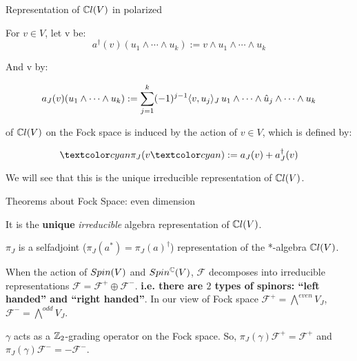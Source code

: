 \begin{frame}{Representation of $\mathbb C l(V)$ in polarized \fjv} %
    
    For $v \in V$, let v be:
    \[ a^\dagger(v) (u_1 \wedge \cdots \wedge u_k) := v \wedge u_1 \wedge \cdots \wedge u_k \]
    
    And v by:
    
    \[ a_J(v) (u_1 \wedge \cdots \wedge u_k) := \sum_{j = 1}^k  (-1)^{j-1}\langle v, u_j \rangle_J\, u_1 \wedge \cdots \wedge \hat u_j \wedge \cdots  \wedge u_k \]
    
     of $\mathbb C l(V)$ on the Fock space is induced by the action of $v \in V$, which is defined by:
    
    \[ \defn{\pi_J(}v\defn{)} := a_J(v) + a_J^\dagger(v) \]
    
    We will see that this is the unique irreducible representation of $\mathbb C l(V)$.
    
\end{frame}

\begin{frame}{Theorems about Fock Space: even dimension} %
    \begin{theorem} It is the \textbf{unique} \emph{irreducible} algebra representation of $\mathbb C l(V)$.\end{theorem}%

    \begin{theorem}$\pi_J$ is a selfadjoint ($\pi_J(a^*) = \pi_J(a)^\dagger$) representation of the *-algebra $\mathbb C l(V)$.\end{theorem}%
    
    \begin{theorem}
    When the action of $Spin(V)$ and $Spin^\mathbb C(V)$, $\mathcal F$ decomposes into irreducible representations $\mathcal F = \mathcal F^+ \oplus \mathcal F^-$. \textbf{i.e. there are $2$ types of spinors: ``left handed'' and ``right handed''}. \tiny {In our view of Fock space $\mathcal F^+ = \bigwedge^{even}V_J$, $\mathcal F^- = \bigwedge^{odd}V_J$. }
    \end{theorem}
    
    \begin{proposition} $\gamma$ acts as a $\mathbb Z_2$-grading operator on the Fock space. So,  $\pi_J(\gamma) \mathcal F^+ = \mathcal F^+$ and $\pi_J(\gamma) \mathcal F^- = -\mathcal F^-$. \end{proposition}%

\end{frame}

